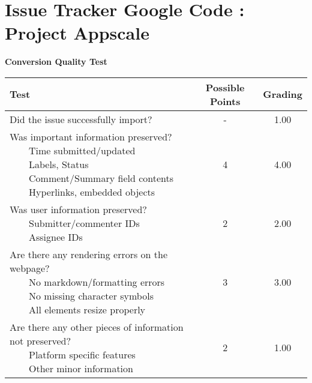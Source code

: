\documentclass{article}
\newcommand{\tabitem}{~~\llap{\textbullet}~~}
\begin{document}
\\\section{Issue Tracker Google Code : Project Appscale}
\textbf{Conversion Quality Test}\\
\begin{adjustbox}{center}
	\renewcommand{\arraystretch}{1.5}
	\begin{tabular}{ p{6cm} | c | c }
		Test & Possible Points & Grading \\ \hline
		Did the issue successfully import? & - & 1.00 \\
		\hline
		\makecell[l]{
			Was important information preserved? \\
			\tabitem Time submitted/updated \\
			\tabitem Labels, Status \\
			\tabitem Comment/Summary field contents \\
			\tabitem Hyperlinks, embedded objects}
		& 4 & 4.00 \\
		\hline
		\makecell[l]{
			Was user information preserved? \\
			\tabitem Submitter/commenter IDs \\
			\tabitem Assignee IDs
		} & 2 & 2.00 \\
		\hline
		\makecell[{{p{6cm}}}]{
			Are there any rendering errors on the webpage? \\
			\tabitem No markdown/formatting errors \\
			\tabitem No missing character symbols \\
			\tabitem All elements resize properly
		} & 3 & 3.00 \\
		\hline
		\makecell[{{p{6cm}}}]{
			Are there any other pieces of information not preserved? \\
			\tabitem Platform specific features \\
			\tabitem Other minor information
		} & 2 & 1.00 \\
	\end{tabular}
\end{adjustbox}
\\
\end{document}
